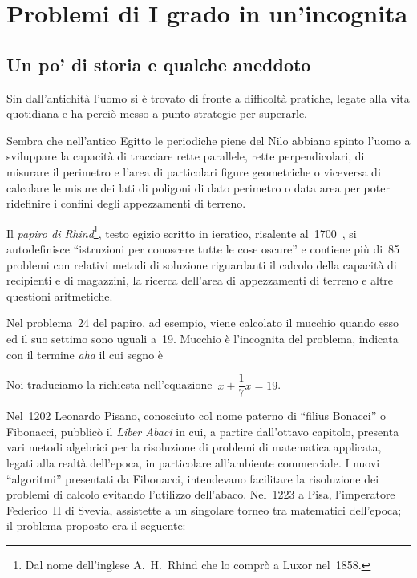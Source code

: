 
\chapter{Problemi di I grado in un'incognita}\label{cap:equazioni_I_grado}

\section{Un po' di storia e qualche aneddoto}

Sin dall'antichità l'uomo si è
trovato di fronte a difficoltà pratiche, legate alla vita quotidiana
e ha perciò messo a punto strategie per superarle.

Sembra che nell'antico Egitto le periodiche piene del
Nilo abbiano spinto l'uomo a sviluppare la capacità
di tracciare rette parallele, rette perpendicolari, di misurare il
perimetro e l'area di particolari figure geometriche o
viceversa di calcolare le misure dei lati di poligoni di dato perimetro
o data area per poter ridefinire i confini degli appezzamenti di
terreno.

Il \emph{papiro di Rhind}\footnote{Dal nome dell'inglese A.~H.~Rhind che lo comprò a Luxor nel~1858.}, testo egizio scritto in
ieratico, risalente al~1700~\aC, si autodefinisce
``istruzioni per conoscere tutte le cose
oscure'' e contiene più di~85 problemi con relativi
metodi di soluzione riguardanti il calcolo della capacità di
recipienti e di magazzini, la ricerca dell'area di
appezzamenti di terreno e altre questioni aritmetiche.

Nel problema~24 del papiro, ad esempio, viene calcolato il mucchio
quando esso ed il suo settimo sono uguali a~19. Mucchio è
l'incognita del problema, indicata con il termine
\emph{aha} il cui segno è


Noi traduciamo la richiesta nell'equazione~$x+\dfrac{1}{7}x=19$.

Nel~1202 Leonardo Pisano, conosciuto col nome paterno di
``filius Bonacci'' o Fibonacci, pubblicò il
\emph{Liber Abaci} in cui, a partire dall'ottavo
capitolo, presenta vari metodi algebrici per la risoluzione di problemi
di matematica applicata, legati alla realtà
dell'epoca, in particolare
all'ambiente commerciale. I nuovi
``algoritmi'' presentati da Fibonacci,
intendevano facilitare la risoluzione dei problemi di calcolo evitando
l'utilizzo dell'abaco. Nel~1223 a
Pisa, l'imperatore Federico~II di Svevia, assistette a
un singolare torneo tra matematici dell'epoca; il
problema proposto era il seguente:

